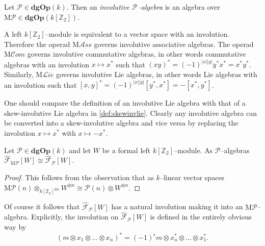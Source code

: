 \documentclass[british]{amsart}
\theoremstyle{plain}
\theoremstyle{definition}
{
\newaliascnt{{definition}}{theorem}\newtheorem{{definition}}[{definition}]{{Definition}}\aliascntresetthe{{definition}}\expandafterautorefname\endcsname{{Definition}}}
{
\newaliascnt{{remark}}{theorem}\newtheorem{{remark}}[{remark}]{{Remark}}\aliascntresetthe{{remark}}\expandafterautorefname\endcsname{{Remark}}}
{
\newaliascnt{{example}}{theorem}\newtheorem{{example}}[{example}]{{Example}}\aliascntresetthe{{example}}\expandafterautorefname\endcsname{{Example}}}
{
\newaliascnt{{examples}}{theorem}\newtheorem{{examples}}[{examples}]{{Examples}}\aliascntresetthe{{examples}}\expandafterautorefname\endcsname{{Examples}}}
{
\newaliascnt{{notation}}{theorem}\newtheorem{{notation}}[{notation}]{{Notation}}\aliascntresetthe{{notation}}\expandafterautorefname\endcsname{{Notation}}}
{
\newaliascnt{{convention}}{theorem}\newtheorem{{convention}}[{convention}]{{Convention}}\aliascntresetthe{{convention}}\expandafterautorefname\endcsname{{Convention}}}
\numberwithin{equation}{section}
\numberwithin{figure}{section}
\begin{document}
\begin{definition}
Let $\mathcal{P}\in{\mathbf{dgOp}}(k)$. Then an \emph{involutive $\mathcal{P}$--algebra} is an algebra over ${\mathrm{M}}\mathcal{P}\in{\mathbf{dgOp}}(k[\mathbb{Z}_2])$.
\end{definition}

A left $k[\mathbb{Z}_2]$--module is equivalent to a vector space with an involution. Therefore the operad ${\mathrm{M}}{\mathcal{A}ss}$ governs involutive associative algebras. The operad ${\mathrm{M}}{\mathcal{C}om}$ governs involutive commutative algebras, in other words commutative algebras with an involution $x\mapsto x^*$ such that $(xy)^*=(-1)^{{\lvert {x} \rvert}{\lvert {y} \rvert}}y^*x^* = x^*y^*$. Similarly, ${\mathrm{M}}{\mathcal{L}ie}$ governs involutive Lie algebras, in other words Lie algebras with an involution such that $[x,y]^* = (-1)^{{\lvert {x} \rvert}{\lvert {y} \rvert}}[y^*,x^*] = -[x^*,y^*]$.

\begin{remark}\label{rem:invskewinv}
One should compare the definition of an involutive Lie algebra with that of a skew-involutive Lie algebra in \autoref{def:skewinvlie}. Clearly any involutive algebra can be converted into a skew-involutive algebra and vice versa by replacing the involution $x\mapsto x^*$ with $x\mapsto -x^*$.
\end{remark}

\begin{proposition}\label{prop:freeinv}
Let $\mathcal{P}\in{\mathbf{dgOp}}(k)$ and let $W$ be a formal left $k[\mathbb{Z}_2]$--module. As $\mathcal{P}$--algebras ${\widehat{\mathcal{F}}_{{{\mathrm{M}}\mathcal{P}}}[{W}]}\cong{\widehat{\mathcal{F}}_{{\mathcal{P}}}[{W}]}$.
\end{proposition}

\begin{proof}
This follows from the observation that as $k$--linear vector spaces ${\mathrm{M}}\mathcal{P}(n)\otimes_{k[\mathbb{Z}_2]^{\otimes n}} W^{\otimes n}\cong \mathcal{P}(n)\otimes W^{\otimes n}$.
\end{proof}

\begin{remark}
Of course it follows that ${\widehat{\mathcal{F}}_{{\mathcal{P}}}[{W}]}$ has a natural involution making it into an ${\mathrm{M}}\mathcal{P}$--algebra. Explicitly, the involution on ${\widehat{\mathcal{F}}_{{\mathcal{P}}}[{W}]}$ is defined in the entirely obvious way by
\[
(m\otimes x_1 \otimes \dots \otimes x_n)^* = (-1)^\epsilon m \otimes x_n^*\otimes \dots \otimes x_1^*.
\]
\end{remark}
\end{document}
